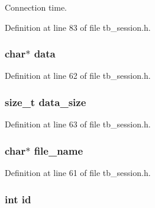 Connection time. 



Definition at line 83 of file tb\-\_\-session.\-h.

\hypertarget{structtb__session__t_a91a70b77df95bd8b0830b49a094c2acb}{
\subsubsection[{data}]{\setlength{\rightskip}{0pt plus 5cm}char$\ast$ data}}\label{structtb__session__t_a91a70b77df95bd8b0830b49a094c2acb}


Definition at line 62 of file tb\-\_\-session.\-h.

\hypertarget{structtb__session__t_ad6bc120bffc64dfc5230863a8ba96596}{
\subsubsection[{data\-\_\-size}]{\setlength{\rightskip}{0pt plus 5cm}size\-\_\-t data\-\_\-size}}\label{structtb__session__t_ad6bc120bffc64dfc5230863a8ba96596}


Definition at line 63 of file tb\-\_\-session.\-h.

\hypertarget{structtb__session__t_a8505c513bc640d1f69e5f76fb32b24a8}{
\subsubsection[{file\-\_\-name}]{\setlength{\rightskip}{0pt plus 5cm}char$\ast$ file\-\_\-name}}\label{structtb__session__t_a8505c513bc640d1f69e5f76fb32b24a8}


Definition at line 61 of file tb\-\_\-session.\-h.

\hypertarget{structtb__session__t_a7441ef0865bcb3db9b8064dd7375c1ea}{
\subsubsection[{id}]{\setlength{\rightskip}{0pt plus 5cm}int id}}\label{structtb__session__t_a7441ef0865bcb3db9b8064dd7375c1ea}


